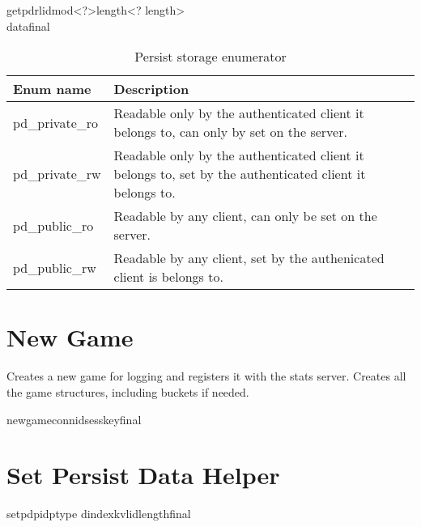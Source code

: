 \documentclass[oneside,titlepage,a4paper]{Definition/retrospy} %
\begin{document}
\begin{mybox}
\tbs getpdr\tbs lid\tbs mod\tbs<?>\tbs length\tbs<? length>\\\tbs data\tbs final\tbs
\end{mybox}

\begin{table}
	\centering
\begin{tabular}{|l|p{8cm}|}
	\hline
	\textbf{Enum name}&\textbf{Description}\\\hline
	pd\_private\_ro& Readable only by the authenticated client it belongs to, can only by set on the server.\\\hline
	pd\_private\_rw& Readable only by the authenticated client it belongs to, set by the authenticated client it belongs to.\\\hline
	pd\_public\_ro& Readable by any client, can only be set on the server.\\\hline
	pd\_public\_rw& Readable by any client, set by the authenicated client is belongs to.\\\hline
\end{tabular}
	\caption{Persist storage enumerator}
\label{Persist storage enumerator}
\end{table}

\section{New Game}
Creates a new game for logging and registers it with the stats server. 
Creates all the game structures, including buckets if needed.
\ClientRequest

\begin{mybox}
	\tbs newgame\tbs\tbs connid\tbs<connection id>\tbs sesskey\tbs<session key>\tbs final\tbs
\end{mybox}

\ServerResponse

\begin{mybox}

\end{mybox}

\section{Set Persist Data Helper}
\ClientRequest
\begin{mybox}
	\tbs setpd\tbs\tbs pid\tbs<profile id>\tbs ptype\tbs <persist storage type> \tbs dindex\tbs<data index>\tbs kv\tbs<key value flag>\tbs lid\tbs <local id>\tbs length\tbs<size of game defined data>\tbs final\tbs
\end{mybox}
\end{document}
